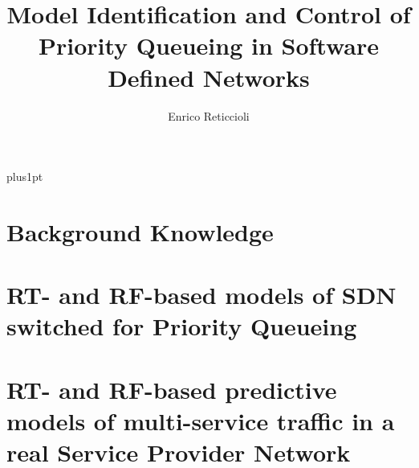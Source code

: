 \documentclass[12pt, a4paper, twoside, openright]{ociamthesis}  %
\title{Model Identification and Control of Priority Queueing in Software Defined Networks} %
\author{Enrico Reticcioli}             %
\begin{document}
\baselineskip=18pt plus1pt

\setcounter{secnumdepth}{4}
\setcounter{tocdepth}{4}

\maketitle                  %



{}

\begin{romanpages}          %
\tableofcontents            %
\listoffigures              %
\listoftables               %
\end{romanpages}            %

%
{}


\chapter{Background Knowledge}


%
\chapter{RT- and RF-based models of SDN switched for Priority Queueing} \label{chap_SDNNetSim}


\chapter{RT- and RF-based predictive models of multi-service traffic in a real Service Provider Network}

{}

\end{document}
